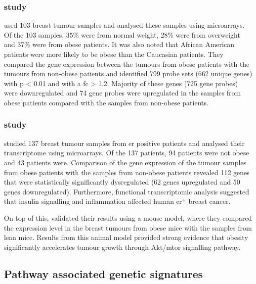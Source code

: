 \subsubsection{\citet{Creighton2012} study}
\label{ssub:creighton_study}

\citet{Creighton2012} used 103 breast tumour samples and analysed these samples using microarrays.
Of the 103 samples, 35\% were from normal weight, 28\% were from overweight and 37\% were from obese patients.
It was also noted that African American patients were more likely to be obese than the Caucasian patients.
They compared the gene expression between the tumours from obese patients with the tumours from non-obese patients and identified 799 probe sets (662 unique genes) with p \textless{} 0.01 and with a \gls{fc} \textgreater{} 1.2.
Majority of these genes (725 gene probes) were downregulated and 74 gene probes were upregulated in the samples from obese patients compared with the samples from non-obese patients.

\subsubsection{\citet{Fuentes-Mattei2014} study}
\label{ssub:fuentes_mattei_study}

\citet{Fuentes-Mattei2014} studied 137 breast tumour samples from \gls{er} positive patients and analysed their transcriptome using microarrays.
Of the 137 patients, 94 patients were not obese and 43 patients were.
Comparison of the gene expression of the tumour samples from obese patients with the samples from non-obese patients revealed 112 genes that were statistically significantly dysregulated (62 genes upregulated and 50 genes downregulated).
Furthermore, functional transcriptomic analysis suggested that insulin signalling and inflammation affected human \gls{er}$^+$ breast cancer.

On top of this, \citet{Fuentes-Mattei2014} validated their results using a mouse model, where they compared the expression level in the breast tumours from obese mice with the samples from lean mice.
Results from this animal model provided strong evidence that obesity significantly accelerates tumour growth through Akt/\gls{mtor} signalling pathway.

\subsection{Pathway associated genetic signatures}
\label{sub:pathway_associated_genetic_signatures}

